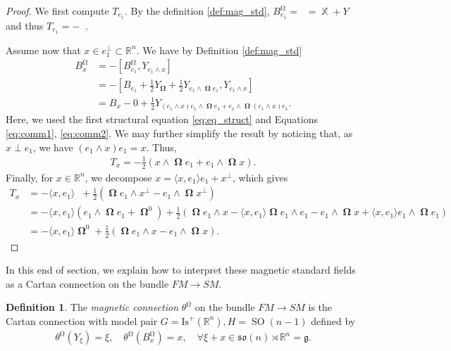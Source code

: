 \documentclass[12pt]{amsart}
\numberwithin{numbering}{section}
\theoremstyle{plain}
\theoremstyle{definition}
\newtheorem{df}[numbering]{Definition}
\theoremstyle{remark}
\numberwithin{equation}{section}
\DeclareMathOperator{\SO}{SO}
\DeclareMathOperator{\xx}{\mathbb{X}}
\DeclareMathOperator{\xs}{\mathbb{X}^{\mg}}
\DeclareMathOperator{\oo}{\mathbf{\Omega}}
\DeclareMathOperator{\ot}{\widetilde{\mathbf{\Omega}}}
\DeclareMathOperator{\mg}{\Omega}
\newcommand{\con}[1]{T_{#1}}
\newcommand{\R}{\mathbb{R}}
\newcommand{\frk}[1]{\mathfrak{#1}}
\begin{document}
\begin{proof}
We first compute $\con{e_1}$. By  the definition \ref{def:mag_std}, $B_{e_1}^{\mg} = \xs = \xx + Y_{\ot}$ and thus $\con{e_1} = - \ot$.

Assume now that $x \in e_1^\perp \subset \R^n$. We have by Definition \ref{def:mag_std} 
\begin{align*}
B_x^{\mg} 
&= - [B_{e_1}^{\mg}, Y_{e_1 \wedge x}] \\ 
&= - [B_{e_1} + \frac{1}{2} Y_{\oo} + \frac{1}{2} Y_{e_1 \wedge \oo e_1}, Y_{e_1 \wedge x}] \\ 
&= B_x - 0 + \frac{1}{2} Y_{(e_1 \wedge x) e_1 \wedge \oo e_1 + e_1 \wedge \oo (e_1 \wedge x) e_1}.
\end{align*}
Here, we used the first structural equation \eqref{eq:eq_struct} and Equations \eqref{eq:comm1}, \eqref{eq:comm2}. We may further simplify the result by noticing that, as $x \perp e_1$, we have $(e_1 \wedge x) e_1 = x$. Thus,
\begin{align*}
\con{x} = - \frac{1}{2} (x \wedge \oo e_1 + e_1 \wedge \oo x).
\end{align*}
Finally, for $x \in \R^n$, we decompose $x = \langle x, e_1 \rangle e_1 + x^\perp$, which gives 
\begin{align*}
\con{x}
&= - \langle x, e_1 \rangle \ot + \frac{1}{2} (\oo e_1 \wedge x^\perp - e_1 \wedge \oo x^\perp) \\ 
&= - \langle x, e_1 \rangle (e_1 \wedge \oo e_1 + \oo^0) + \frac{1}{2} (\oo e_1 \wedge x - \langle x, e_1 \rangle \oo e_1 \wedge e_1 - e_1 \wedge \oo x + \langle x, e_1 \rangle e_1 \wedge \oo e_1) \\ 
&= - \langle x, e_1 \rangle \oo^0 + \frac{1}{2}(\oo e_1 \wedge x - e_1 \wedge \oo x).
\end{align*}
\end{proof}

\bigskip 

In this end of section, we explain how to interpret these magnetic standard fields as a Cartan connection on the bundle $FM \to SM$.
\begin{df}
The \emph{magnetic connection} $\theta^{\mg}$ on the bundle $FM \to SM$ is the Cartan connection with model pair $G = \mathrm{Is}^+(\R^n), H = \SO(n-1)$ defined by 
\begin{align}
\theta^{\mg}(Y_\xi) = \xi, \quad \theta^{\mg}(B^{\mg}_x) = x, \quad \forall \xi + x \in \frk{so}(n) \rtimes \R^n = \frk{g}. 
\end{align}
\end{df}
\end{document}
